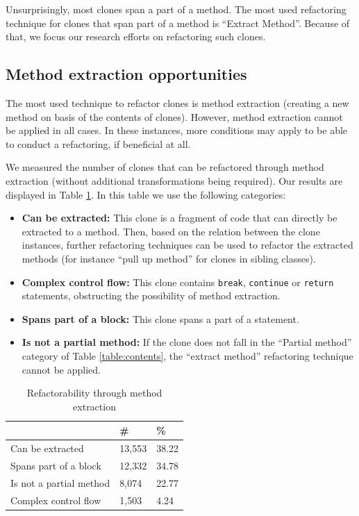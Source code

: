 \documentclass[a4paper]{article}
\begin{document}
Unsurprisingly, most clones span a part of a method. The most used refactoring technique for clones that span part of a method is ``Extract Method''. Because of that, we focus our research efforts on refactoring such clones.

\subsection{Method extraction opportunities}\label{chap:mergingdups}
The most used technique to refactor clones is method extraction (creating a new method on basis of the contents of clones). However, method extraction cannot be applied in all cases. In these instances, more conditions may apply to be able to conduct a refactoring, if beneficial at all.

We measured the number of clones that can be refactored through method extraction (without additional transformations being required). Our results are displayed in Table \ref{table:refactorability}. In this table we use the following categories:
\begin{itemize}
    \item \textbf{Can be extracted:} This clone is a fragment of code that can directly be extracted to a method. Then, based on the relation between the clone instances, further refactoring techniques can be used to refactor the extracted methods (for instance ``pull up method'' for clones in sibling classes).
    \item \textbf{Complex control flow:} This clone contains \texttt{break}, \texttt{continue} or \texttt{return} statements, obstructing the possibility of method extraction.
    \item \textbf{Spans part of a block:} This clone spans a part of a statement.
    \item \textbf{Is not a partial method:} If the clone does not fall in the ``Partial method'' category of Table \ref{table:contents}, the ``extract method'' refactoring technique cannot be applied.
\end{itemize}

\begin{table}[H]
  \begin{center}
  \caption{Refactorability through method extraction} \label{table:refactorability}
  \medskip
\begin{tabular}{|l|l|l|}
\hline
\textbf{}         & \textbf{\#} & \textbf{\%} \\ \hline
Can be extracted     & 13,553 & 38.22 \\ \hline
Spans part of a block  & 12,332 & 34.78 \\ \hline
Is not a partial method   & 8,074 & 22.77 \\ \hline
Complex control flow & 1,503 & 4.24 \\ \hline
\end{tabular}
\end{center}
\end{table}
\end{document}
